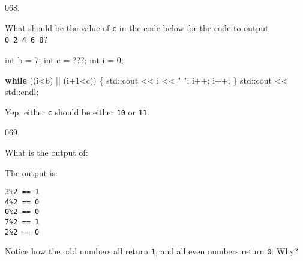 \documentclass[]{book}
\newenvironment{Shaded}{}{}
\newcommand{\BuiltInTok}[1]{#1}
\newcommand{\ControlFlowTok}[1]{\textcolor[rgb]{0.00,0.44,0.13}{\textbf{#1}}}
\newcommand{\DataTypeTok}[1]{\textcolor[rgb]{0.56,0.13,0.00}{#1}}
\newcommand{\DecValTok}[1]{\textcolor[rgb]{0.25,0.63,0.44}{#1}}
\newcommand{\NormalTok}[1]{#1}
\newcommand{\StringTok}[1]{\textcolor[rgb]{0.25,0.44,0.63}{#1}}
\begin{document}
\begin{minipage}{\linewidth}\noindent
{\tiny 068.}\\
\begin{minipage}[t]{.485\linewidth}

What should be the value of \texttt{c} in the code below for the code to
output \texttt{0\ 2\ 4\ 6\ 8}?

\begin{framed}

\begin{Shaded}
\begin{Highlighting}[]
\DataTypeTok{int}\NormalTok{ b = }\DecValTok{7}\NormalTok{;}
\DataTypeTok{int}\NormalTok{ c = ???;}
\DataTypeTok{int}\NormalTok{ i = }\DecValTok{0}\NormalTok{;}

\ControlFlowTok{while}\NormalTok{ ((i<b) || (i}\DecValTok{+1}\NormalTok{<c)) \{}
  \BuiltInTok{std::}\NormalTok{cout << i << }\StringTok{" "}\NormalTok{;}
\NormalTok{  i++;}
\NormalTok{  i++;}
\NormalTok{\}}
\BuiltInTok{std::}\NormalTok{cout << }\BuiltInTok{std::}\NormalTok{endl;}
\end{Highlighting}
\end{Shaded}

\end{framed}

\end{minipage}
\hfill
\begin{minipage}[t]{.485\linewidth}

Yep, either \texttt{c} should be either \texttt{10} or \texttt{11}.

\end{minipage}
\end{minipage}

\vspace{2mm}\noindent\hrulefill{}

\begin{minipage}{\linewidth}\noindent
{\tiny 069.}\\
\begin{minipage}[t]{.485\linewidth}

What is the output of:

\end{minipage}
\hfill
\begin{minipage}[t]{.485\linewidth}

The output is:

\begin{framed}

\begin{verbatim}
3%2 == 1
4%2 == 0
0%2 == 0
7%2 == 1
2%2 == 0
\end{verbatim}

\end{framed}

Notice how the odd numbers all return \texttt{1}, and all even numbers
return \texttt{0}. Why?

\end{minipage}
\end{minipage}
\end{document}
